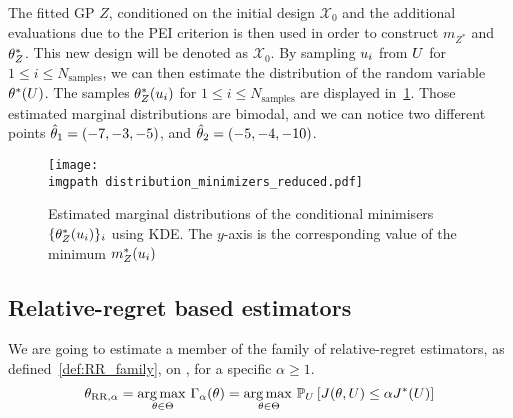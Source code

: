 \documentclass[../../Main_ManuscritThese.tex]{subfiles}
\newcommand\imgpath{/home/victor/acadwriting/Manuscrit/Text/Chapter5/img/}
\begin{document}
The fitted GP $Z$, conditioned on the initial design $\mathcal{X}_0$
and the additional evaluations due to the PEI criterion is then used
in order to construct $m_{Z^*}$ and $\theta^*_Z$. This new design will be
denoted as $\mathcal{X}_0$. By sampling $u_i$ from
$U$ for $1\leq i \leq N_{\mathrm{samples}}$, we can then estimate
the distribution of the random variable $\theta^*(U)$. The samples
$\theta^*_Z(u_i)$ for $1\leq i \leq N_{\mathrm{samples}}$ are displayed
in~\cref{fig:distrib_minimizers_reduced}. Those estimated marginal
distributions are bimodal, and we can notice two different points
$\hat{\theta}_1=(-7, -3, -5)$, and $\hat{\theta}_2=(-5, -4, -10)$.
\begin{figure}[ht]
  \centering
  \texttt{[image: \\imgpath distribution\_minimizers\_reduced.pdf]}
  \caption{\label{fig:distrib_minimizers_reduced} Estimated marginal
    distributions of the conditional minimisers $\{\theta^*_Z(u_i)\}_i$
    using KDE. The $y$-axis is the corresponding value of the minimum
    $m_Z^*(u_i)$}
\end{figure}

\subsection{Relative-regret based estimators}
We are going to estimate a member of the family of relative-regret
estimators, as defined~\cref{def:RR_family}, on
, for a specific $\alpha\geq 1$.
\begin{equation}
  \theta_{\mathrm{RR},\alpha} = \operatorname*{arg\,max \,}_{\theta\in\Theta} \Gamma_{\alpha}(\theta) = \operatorname*{arg\,max \,}_{\theta \in \Theta} \mathbb{P}_{U}\left[J(\theta, U) \leq \alpha J^*(U)\right]
\end{equation}
\end{document}
